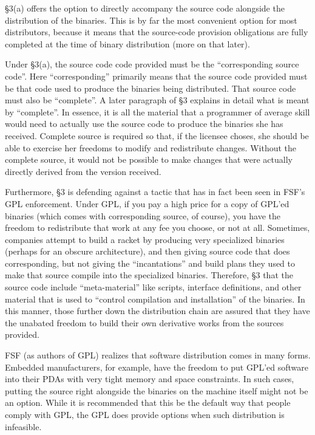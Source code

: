 \documentclass[12pt]{report}
\begin{document}
\S 3(a) offers the option to directly accompany the source code alongside
the distribution of the binaries.  This is by far the most convenient
option for most distributors, because it means that the source-code
provision obligations are fully completed at the time of binary
distribution (more on that later).

Under \S 3(a), the source code code provided must be the ``corresponding
source code''.  Here ``corresponding'' primarily means that the source
code provided must be that code used to produce the binaries being
distributed.  That source code must also be ``complete''.  A later
paragraph of \S 3 explains in detail what is meant by ``complete''.  In
essence, it is all the material that a programmer of average skill would
need to actually use the source code to produce the binaries she has
received.  Complete source is required so that, if the licensee choses,
she should be able to exercise her freedoms to modify and redistribute
changes.  Without the complete source, it would not be possible to make
changes that were actually directly derived from the version received.

Furthermore, \S 3 is defending against a tactic that has in fact been seen
in FSF's GPL enforcement.  Under GPL, if you pay a high price for a copy
of GPL'ed binaries (which comes with corresponding source, of course), you
have the freedom to redistribute that work at any fee you choose, or not
at all.  Sometimes, companies attempt to build a racket by producing very
specialized binaries (perhaps for an obscure architecture), and then
giving source code that does corresponding, but not giving the
``incantations'' and build plans they used to make that source compile
into the specialized binaries.  Therefore, \S 3 that the source code
include ``meta-material'' like scripts, interface definitions, and other material
that is used to ``control compilation and installation'' of the binaries.
In this manner, those further down the distribution chain are assured that
they have the unabated freedom to build their own derivative works from
the sources provided.

FSF (as authors of GPL) realizes that software distribution comes in many
forms.  Embedded manufacturers, for example, have the freedom to put
GPL'ed software into their PDAs with very tight memory and space
constraints.  In such cases, putting the source right alongside the
binaries on the machine itself might not be an option.  While it is
recommended that this be the default way that people comply with GPL, the
GPL does provide options when such distribution is infeasible.
\end{document}
